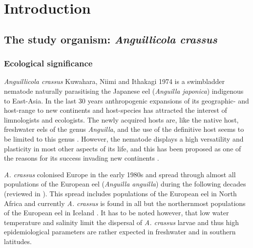 

\chapter{Introduction}
\label{chap:intro}
\ifpdf
    \graphicspath{{1_introduction/figures/PNG/}{1_introduction/figures/PDF/}{1_introduction/figures/}}
\else
    \graphicspath{{1_introduction/figures/EPS/}{1_introduction/figures/}}
\fi


\section{The study organism: \textit{Anguillicola crassus}} 
\label{stud-org}

\subsection{Ecological significance} 
\label{eco-sig}

\textit{Anguillicola crassus} Kuwahara, Niimi and Ithakagi 1974
\cite{kuwahara_Niimi_Itagaki_1974} is a swimbladder nematode naturally
parasitising the Japanese eel (\textit{Anguilla japonica}) indigenous
to East-Asia. In the last 30 years anthropogenic expansions of its
geographic- and host-range to new continents and host-species has
attracted the interest of limnologists and ecologists. The newly
acquired hosts are, like the native host, freshwater eels of the genus
\textit{Anguilla}, and the use of the definitive host seems to be
limited to this genus \cite{sures_development_1999}. However, the
nematode displays a high versatility and plasticity in most other
aspects of its life, and this has been proposed as one of the reasons
for its success invading new continents
\cite{taraschewski_hosts_2007}.

\textit{A. crassus} colonised Europe in the early 1980s and spread
through almost all populations of the European eel (\textit{Anguilla
  anguilla}) during the following decades (reviewed in
\cite{kirk_impact_2003}). This spread includes populations of the
European eel in North Africa
\cite{gargouri_ben_abdallah_spatio-temporal_2006,
  loukili_dynamics_2007} and currently \textit{A. crassus} is found in
all but the northernmost populations of the European eel in Iceland
\cite{kristmundsson_parasite_2007}. It has to be noted however, that
low water temperature \cite{knopf_impact_1998} and salinity
\cite{kirk_effect_2000} limit the dispersal of \textit{A. crassus}
larvae and thus high epidemiological parameters are rather expected in
freshwater and in southern latitudes.


